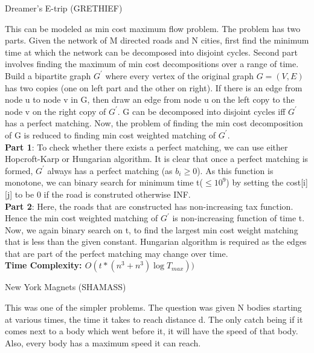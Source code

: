 \documentclass[solution,addpoints,12pt]{exam}
\begin{document}
\begin{questions}
\begin{solution}
\end{solution}

\question

  Dreamer's E-trip (GRETHIEF)

\begin{solution}
  This can be modeled as min cost maximum flow problem. The problem has two parts. Given the network of M directed roads and N cities, first find the minimum time at which the network can be decomposed into disjoint cycles. Second part involves finding the maximum of min cost decompositions over a range of time.\\
  
   Build a bipartite graph $G^{'}$ where every vertex of the original graph $G=(V,E)$ has two copies (one on left part and the other on right). If there is an edge from node u to node v in G, then draw an edge from node u on the left copy to the node v on the right copy of $G^{'}$. G can be decomposed into disjoint cycles iff $G^{'}$ has a perfect matching. Now, the problem of finding the min cost decomposition of G is reduced to finding min cost weighted matching of $G^{'}$.\\
   
   \textbf{Part 1}: To check whether there exists a perfect matching, we can use either Hopcroft-Karp or Hungarian algorithm. It is clear that once a perfect matching is formed, $G^{'}$ always has a perfect matching (as $b_i\geq0$). As this function is monotone, we can binary search for minimum time t($\leq 10^9$) by setting the cost[i][j] to be 0 if the road is construted otherwise INF.\\
   
   \textbf{Part 2}: Here, the roads that are constructed has non-increasing tax function. Hence the min cost weighted matching of $G^{'}$ is non-increasing function of time t. Now, we again binary search on t, to find the largest min cost weight matching that is less than the given constant. Hungarian algorithm is required as the edges that are part of the perfect matching may change over time.\\
   
   \textbf{Time Complexity: $O(t \ast (n^3 + n^3) \log T_{max}))$} \\
  
\end{solution}

\question
  New York Magnets (SHAMASS)

\begin{solution}
    This was one of the simpler problems. The question was given N bodies starting at various times, the time it takes to reach distance d. The only 
    catch being if it comes next to a body which went before it, it will have the speed of that body. Also, every body has a maximum speed it can reach. \\
    

\end{solution}
\end{questions}
\end{document}
